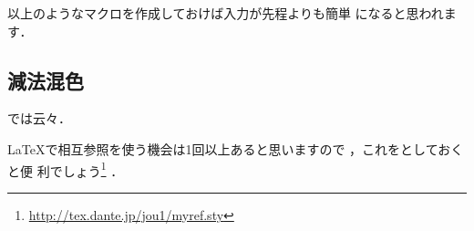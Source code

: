 \begin{InTeX}
\newcommand*\pref[2]{(\pageref{#1:#2}ページ)}
\newcommand*\fullchapref[1]{第\ref{chap:#1}章 \pref{chap}{#1}}
\newcommand*\fullsecref[1]{\ref{sec:#1}~節 \pref{sec}{#1}}
\newcommand*\fullfigref[1]{図~\ref{fig:#1} \pref{fig}{#1}}
\newcommand*\fulltabref[1]{表~\ref{tab:#1} \pref{tab}{#1}}
\newcommand*\fullequref[1]{式~\ref{equ:#1} \pref{equ}{#1}}
\end{InTeX}

以上のようなマクロを作成しておけば入力が先程よりも簡単
になると思われます．

\begin{InTeX}
\section{減法混色}
では云々．
\end{InTeX}

{\LaTeX}で相互参照を使う機会は1回以上あると思いますので 
，これをとしておくと便
利でしょう\footnote{\url{http://tex.dante.jp/jou1/myref.sty}} ．

